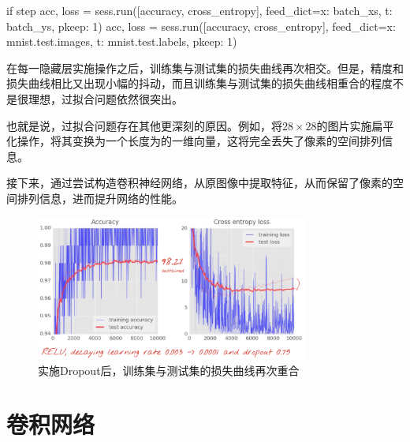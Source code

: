 \begin{content}
\begin{leftbar}
\begin{python}
    if step %
      acc, loss = sess.run([accuracy, cross_entropy], 
        feed_dict={x: batch_xs, t: batch_ys, pkeep: 1})
      acc, loss = sess.run([accuracy, cross_entropy], 
        feed_dict={x: mnist.test.images, t: mnist.test.labels, pkeep: 1})
\end{python}
\end{leftbar}

在每一隐藏层实施操作之后，训练集与测试集的损失曲线再次相交。但是，精度和损失曲线相比又出现小幅的抖动，而且训练集与测试集的损失曲线相重合的程度不是很理想，过拟合问题依然很突出。

也就是说，过拟合问题存在其他更深刻的原因。例如，将$ 28 \times 28 $的图片实施扁平化操作，将其变换为一个长度为的一维向量，这将完全丢失了像素的空间排列信息。

接下来，通过尝试构造卷积神经网络，从原图像中提取特征，从而保留了像素的空间排列信息，进而提升网络的性能。

\begin{figure}[H]
\centering
\includegraphics[width=0.8\textwidth]{figures/mnist-apply-dropout-result.png}
\caption{实施Dropout后，训练集与测试集的损失曲线再次重合}
 \label{fig:mnist-apply-dropout-result}
\end{figure}

\end{content}

\section{卷积网络}


